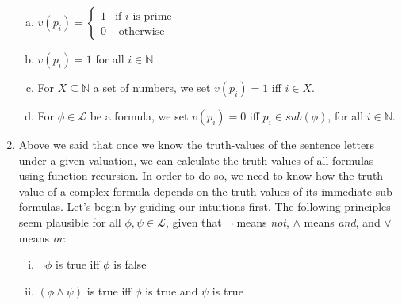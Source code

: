 \begin{enumerate}[\thesection.1]
\begin{enumerate}[(a)]
			\item $v(p_i)=\begin{cases} 1 & \text{if }i\text{ is prime}\\0 & \text{ otherwise}\end{cases}$
			
			\item $v(p_i)=1$ for all $i\in \mathbb{N}$
			
			\item For $X\subseteq \mathbb{N}$ a set of numbers, we set $v(p_i)=1$ iff $i\in X$.
			
			\item For $\phi\in\mathcal{L}$ be a formula, we set $v(p_i)=0$ iff $p_i\in sub(\phi)$, for all $i\in\mathbb{N}$.
			
			 	
		\end{enumerate}
		
		\item Above we said that once we know the truth-values of the sentence letters under a given valuation, we can calculate the truth-values of all formulas using function recursion. In order to do so, we need to know how the truth-value of a complex formula depends on the truth-values of its immediate sub-formulas. Let's begin by guiding our intuitions first. The following principles seem plausible for all $\phi,\psi\in\mathcal{L}$, given that $\neg$ means \emph{not}, $\land$ means \emph{and}, and $\lor$ means \emph{or}:
		
		\begin{enumerate}[(i)]
						
				\item $\neg\phi$ is true iff $\phi$ is false
					
				\item $(\phi\land\psi)$ is true iff $\phi$ is true and $\psi$ is true					
						

\end{enumerate}
\end{enumerate}
